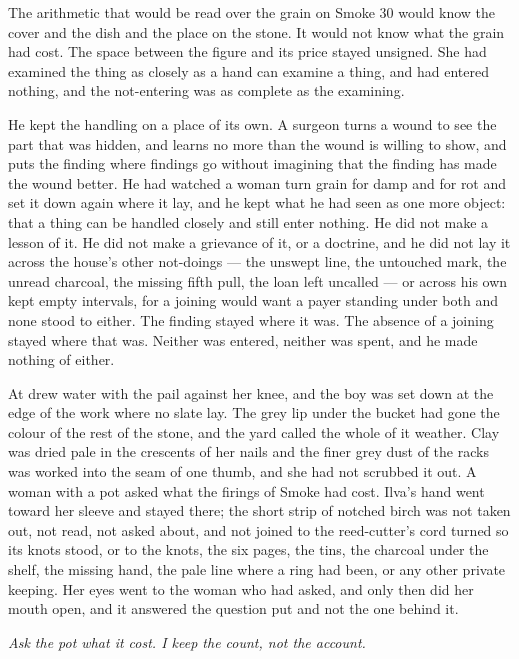 The arithmetic that would be read over the grain on Smoke 30 would know the cover and the dish and the place on the stone. It would not know what the grain had cost. The space between the figure and its price stayed unsigned. She had examined the thing as closely as a hand can examine a thing, and had entered nothing, and the not-entering was as complete as the examining.

He kept the handling on a place of its own. A surgeon turns a wound to see the part that was hidden, and learns no more than the wound is willing to show, and puts the finding where findings go without imagining that the finding has made the wound better. He had watched a woman turn grain for damp and for rot and set it down again where it lay, and he kept what he had seen as one more object: that a thing can be handled closely and still enter nothing. He did not make a lesson of it. He did not make a grievance of it, or a doctrine, and he did not lay it across the house's other not-doings --- the unswept line, the untouched mark, the unread charcoal, the missing fifth pull, the loan left uncalled --- or across his own kept empty intervals, for a joining would want a payer standing under both and none stood to either. The finding stayed where it was. The absence of a joining stayed where that was. Neither was entered, neither was spent, and he made nothing of either.

\scenebreak

At   drew water with the pail against her knee, and the boy was set down at the edge of the work where no slate lay. The grey lip under the bucket had gone the colour of the rest of the stone, and the yard called the whole of it weather. Clay was dried pale in the crescents of her nails and the finer grey dust of the racks was worked into the seam of one thumb, and she had not scrubbed it out. A woman with a pot asked what the firings of Smoke had cost. Ilva's hand went toward her sleeve and stayed there; the short strip of notched birch was not taken out, not read, not asked about, and not joined to the reed-cutter's cord turned so its knots stood, or to the knots, the six pages, the tins, the charcoal under the shelf, the missing hand, the pale line where a ring had been, or any other private keeping. Her eyes went to the woman who had asked, and only then did her mouth open, and it answered the question put and not the one behind it.

\emph{Ask the pot what it cost. I keep the count, not the account.}

